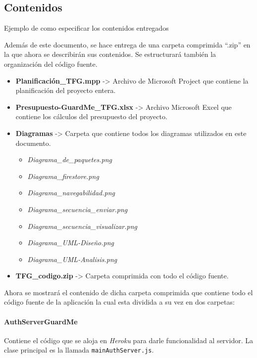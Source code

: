 
\subsection*{Contenidos} 

\textcolor[rgb]{0.65,0.16,0}{Ejemplo de como especificar los contenidos entregados}

Además de este documento, se hace entrega de una carpeta comprimida ``.zip'' en la que ahora se describirán sus contenidos. Se estructurará también la organización del código fuente.

\begin{itemize}
	\item \textbf{Planificación\_TFG.mpp} -> Archivo de Microsoft Project que contiene la planificación del proyecto entera.
	\item \textbf{Presupuesto-GuardMe\_TFG.xlsx} -> Archivo Microsoft Excel que contiene los cálculos del presupuesto del proyecto.
	\item \textbf{Diagramas} -> Carpeta que contiene todos los diagramas utilizados en este documento.
	\begin{itemize}
		\item \textit{Diagrama\_de\_paquetes.png}
		\item \textit{Diagrama\_firestore.png}
		\item \textit{Diagrama\_navegabilidad.png}
		\item \textit{Diagrama\_secuencia\_enviar.png}
		\item \textit{Diagrama\_secuencia\_visualizar.png}
		\item \textit{Diagrama\_UML-Diseño.png}
		\item \textit{Diagrama\_UML-Analisis.png}
	\end{itemize}
	\item \textbf{TFG\_codigo.zip} -> Carpeta comprimida con todo el código fuente.
\end{itemize}

Ahora se mostrará el contenido de dicha carpeta comprimida que contiene todo el código fuente de la aplicación la cual esta dividida a su vez en dos carpetas:

\paragraph*{AuthServerGuardMe}
Contiene el código que se aloja en \textit{Heroku} para darle funcionalidad al servidor. La clase principal es la llamada \texttt{mainAuthServer.js}.

